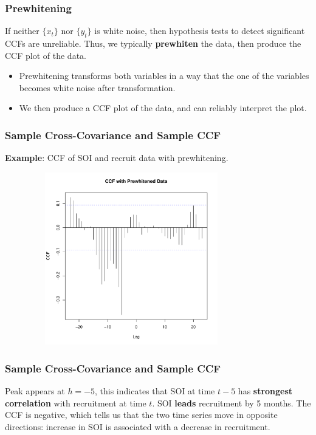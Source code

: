 \documentclass[%
xcolor=pdftex]{beamer}
\begin{document}
\begin{frame}
\frametitle{Prewhitening}

If neither $\{x_t\}$ nor $\{y_t\}$ is white noise, then hypothesis tests to detect significant CCFs are unreliable. Thus, we typically \textbf{prewhiten} the data, then produce the CCF plot of the data. 

\begin{itemize}

\item Prewhitening transforms both variables in a way that the one of the variables becomes white noise after transformation. 

\item We then produce a CCF plot of the data, and can reliably interpret the plot. 

\end{itemize}

\end{frame}

\begin{frame}
\frametitle{Sample Cross-Covariance and Sample CCF}

\textbf{Example}: CCF of SOI and recruit data with prewhitening.

\includegraphics[width=110mm, height=75mm]{ccf_soi.pdf}

\end{frame}

\begin{frame}
\frametitle{Sample Cross-Covariance and Sample CCF}

Peak appears at $h=-5$, this indicates that SOI at time $t-5$ has \textbf{strongest correlation} with recruitment at time $t$. SOI \textbf{leads} recruitment by 5 months. The CCF is negative, which tells us that the two time series move in opposite directions: increase in SOI is associated with a decrease in recruitment.

\end{frame}
\end{document}
